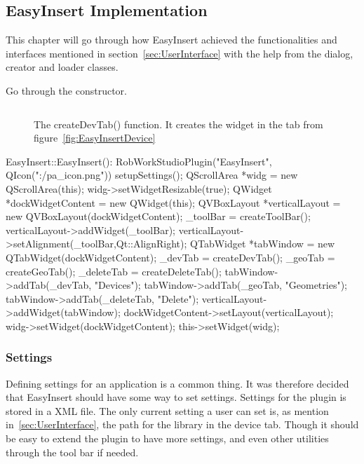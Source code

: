 \subsection{EasyInsert Implementation}
This chapter will go through how EasyInsert achieved the functionalities and interfaces mentioned in section~\ref{sec:UserInterface} with the help from the dialog, creator and loader classes. 

Go through the constructor.

\begin{figure}[h] %
\centering
\lstset{language=C++} 
\begin{lstlisting}[frame=single]  

\end{lstlisting}
\caption{The createDevTab() function. It creates the widget in the tab from figure~\ref{fig:EasyInsertDevice}}
\label{fig:eiConstructor} 	
\end{figure}
EasyInsert::EasyInsert():
    RobWorkStudioPlugin("EasyInsert", QIcon(":/pa_icon.png"))
{
    setupSettings();
    QScrollArea *widg = new QScrollArea(this);
	widg->setWidgetResizable(true);
	QWidget *dockWidgetContent = new QWidget(this);
	QVBoxLayout *verticalLayout = new QVBoxLayout(dockWidgetContent);
    _toolBar = createToolBar();
    verticalLayout->addWidget(_toolBar);
    verticalLayout->setAlignment(_toolBar,Qt::AlignRight);
    QTabWidget *tabWindow = new QTabWidget(dockWidgetContent);
    _devTab = createDevTab();
    _geoTab = createGeoTab();
    _deleteTab = createDeleteTab();
    tabWindow->addTab(_devTab, "Devices");
    tabWindow->addTab(_geoTab, "Geometries");
    tabWindow->addTab(_deleteTab, "Delete");
    verticalLayout->addWidget(tabWindow);
    dockWidgetContent->setLayout(verticalLayout);
    widg->setWidget(dockWidgetContent);
	this->setWidget(widg);
}
\subsubsection{Settings}
\label{sec:Settings}
Defining settings for an application is a common thing. It was therefore decided that EasyInsert should have some way to set settings. Settings for the plugin is stored in a XML file. The only current setting a user can set is, as mention in~\ref{sec:UserInterface}, the path for the library in the device tab. Though it should be easy to extend the plugin to have more settings, and even other utilities through the tool bar if needed.\\

